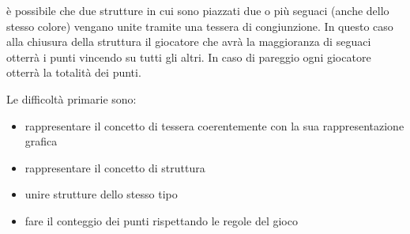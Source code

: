 è possibile che due strutture in cui sono piazzati due o più seguaci (anche dello stesso colore) vengano unite tramite una tessera di congiunzione. In questo caso alla chiusura della struttura il giocatore che avrà la maggioranza di seguaci otterrà i punti vincendo su tutti gli altri. In caso di pareggio ogni giocatore otterrà la totalità dei punti.

Le difficoltà primarie sono:
\begin{itemize}
    \item rappresentare il concetto di tessera coerentemente con la sua rappresentazione grafica
    \item rappresentare il concetto di struttura
    \item unire strutture dello stesso tipo
    \item fare il conteggio dei punti rispettando le regole del gioco
\end{itemize}


